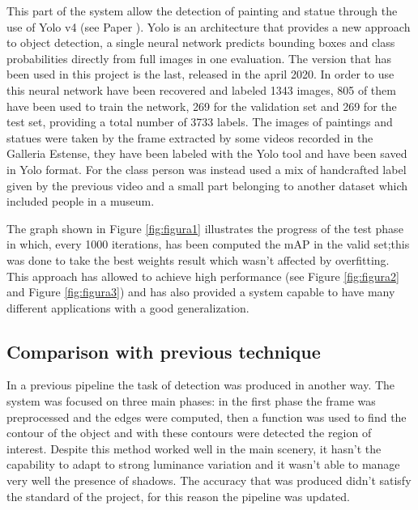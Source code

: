 This part of the system allow the detection of painting and statue through the use of Yolo v4 (see Paper \cite{Yolov4}).
Yolo is an architecture that provides a new approach to object detection, a single neural network predicts bounding boxes and class probabilities directly from full images in one evaluation. The version that has been used in this project is the last, released in the april 2020.
In order to use this neural network have been recovered and labeled 1343 images, 805 of them have been used to train the network, 269 for the validation set and 269 for the test set, providing a total number of 3733 labels. The images of paintings and statues were taken by the frame extracted by some videos recorded in the Galleria Estense, they have been labeled with the Yolo tool and have been saved in Yolo format. For the class person was instead used a mix of handcrafted label given by the previous video and a small part belonging to another dataset which included people in a museum.

The graph shown in Figure \ref{fig:figura1} illustrates the progress of the test phase in which, every 1000 iterations, has been computed the mAP in the valid set;this was done to take the best weights result which wasn't affected by overfitting.
This approach has allowed to achieve high performance (see Figure \ref{fig:figura2} and Figure \ref{fig:figura3}) %
and has also provided a system capable to have many different applications with a good generalization.


\subsection{Comparison with previous technique} 
In a previous pipeline the task of detection was produced in another way.
The system was focused on three main phases: in the first phase the frame %
was preprocessed and the edges were computed, then a function was used to find the contour of the object and with these contours were detected the region of interest. Despite this method worked well in the main scenery, it hasn't the capability to adapt to strong luminance variation and it wasn't able to manage very well the presence of shadows.
The accuracy that was produced didn't satisfy the standard of the project, for this reason the pipeline was updated.

